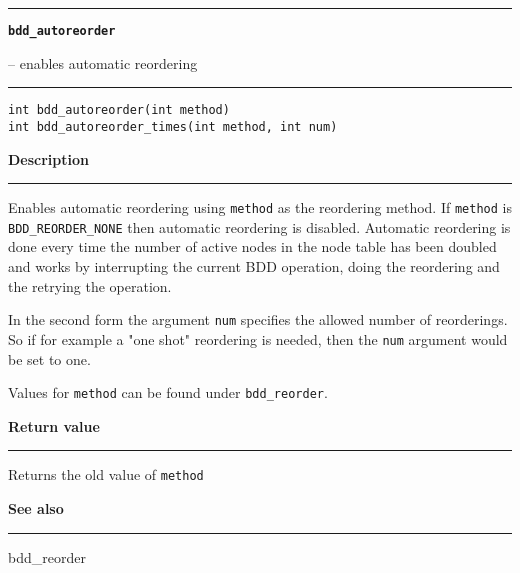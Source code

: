 \vspace{8ex}
\begin{minipage}{\textwidth}

\noindent\begin{minipage}{\textwidth}
\rule{\textwidth}{0.5mm}
{\tt\bf bdd\_autoreorder }
\--- enables automatic reordering  \hspace{\fill}
\\\rule[1.5ex]{\textwidth}{0.5mm}
\end{minipage}

\noindent\begin{verbatim}
int bdd_autoreorder(int method)
int bdd_autoreorder_times(int method, int num) 
\end{verbatim}

\vspace{\parsep}\noindent
{\bf Description}\\\rule[1.5ex]{\textwidth}{0.2mm}\vspace{-1.5ex}\setlength{\parindent}{1em}
Enables automatic reordering using {\tt method} as the reordering
           method. If {\tt method} is {\tt BDD\_REORDER\_NONE} then
           automatic reordering is disabled. Automatic
	   reordering is done every time the number of active nodes in the
	   node table has been doubled and works by interrupting the current
	   BDD operation, doing the reordering and the retrying the operation.

	   In the second form the argument {\tt num} specifies the allowed
	   number of reorderings. So if for example a "one shot" reordering
	   is needed, then the {\tt num} argument would be set to one.

	   Values for {\tt method} can be found under {\tt bdd\_reorder}.
	   

\setlength{\parindent}{0em}\vspace{\parsep}\vspace{\baselineskip}\noindent
{\bf Return value}\\\rule[1.5ex]{\textwidth}{0.2mm}\vspace{-1.5ex}
Returns the old value of {\tt method} 

\vspace{\parsep}\vspace{\baselineskip}\noindent
{\bf See also}\\\rule[1.5ex]{\textwidth}{0.2mm}\vspace{-1.5ex}
bdd\_reorder 
\end{minipage}
